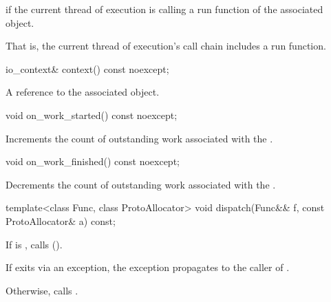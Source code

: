 \begin{itemdescr}
\pnum
\returns {} if the current thread of execution is calling a run function of the associated  object. \begin{note} That is, the current thread of execution's call chain includes a run function. \end{note}
\end{itemdescr}

%
\begin{itemdecl}
io_context& context() const noexcept;
\end{itemdecl}

\begin{itemdescr}
\pnum
\returns A reference to the associated  object.
\end{itemdescr}

%
\begin{itemdecl}
void on_work_started() const noexcept;
\end{itemdecl}

\begin{itemdescr}
\pnum
\effects Increments the count of outstanding work associated with the .
\end{itemdescr}

%
\begin{itemdecl}
void on_work_finished() const noexcept;
\end{itemdecl}

\begin{itemdescr}
\pnum
\effects Decrements the count of outstanding work associated with the .
\end{itemdescr}

%
\begin{itemdecl}
template<class Func, class ProtoAllocator>
  void dispatch(Func&& f, const ProtoAllocator& a) const;
\end{itemdecl}

\begin{itemdescr}
\pnum
\effects If  is , calls  (). \begin{note} If  exits via an exception, the exception propagates to the caller of . \end{note} Otherwise, calls .
\end{itemdescr}

